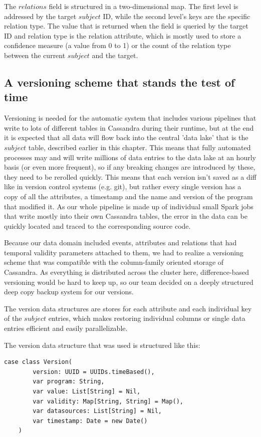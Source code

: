 \documentclass[
        a4paper,     %
        titlepage,   %
        oneside,     %
        parskip      %
]{scrartcl}          %
\begin{document}
    The $relations$ field is structured in a two-dimensional map. The first level
    is addressed by the target $subject$ ID, while the second level's keys are the
    specific relation type. The value that is returned when the field is queried
    by the target ID and relation type is the relation attribute, which is mostly
    used to store a confidence measure (a value from 0 to 1) or the count of the
    relation type between the current $subject$ and the target.

    \subsection{A versioning scheme that stands the test of time}
    Versioning is needed for the automatic system that includes various pipelines
    that write to lots of different tables in Cassandra during their runtime,
    but at the end it is expected that all data will flow back into the central
    'data lake' that is the $subject$ table, described earlier in this chapter.
    This means that fully automated processes may and will write millions of
    data entries to the data lake at an hourly basis (or even more frequent),
    so if any breaking changes are introduced by these, they need to be rerolled quickly.
    This means that each version isn't saved as a diff like in version control systems
    (e.g. git), but rather every single version has a copy of all the attributes,
    a timestamp and the name and version of the program that modified it.
    As our whole pipeline is made up of individual small Spark jobs that write
    mostly into their own Cassandra tables, the error in the data can be quickly
    located and traced to the corresponding source code.

    Because our data domain included events, attributes and relations that had
    temporal validity parameters attached to them, we had to realize a versioning
    scheme that was compatible with the column-family oriented storage of Cassandra.
    As everything is distributed across the cluster here, difference-based versioning
    would be hard to keep up, so our team decided on a deeply structured deep copy
    backup system for our versions.

    The version data structures are stores for each attribute and each individual
    key of the $subject$ entries, which makes restoring individual columns or single
    data entries efficient and easily parallelizable.

    The version data structure that was used is structured like this:
    \begin{lstlisting}[style=scalaStyle,caption=Version]
    case class Version(
    	version: UUID = UUIDs.timeBased(),
    	var program: String,
    	var value: List[String] = Nil,
    	var validity: Map[String, String] = Map(),
    	var datasources: List[String] = Nil,
    	var timestamp: Date = new Date()
    )
    \end{lstlisting}
\end{document}
